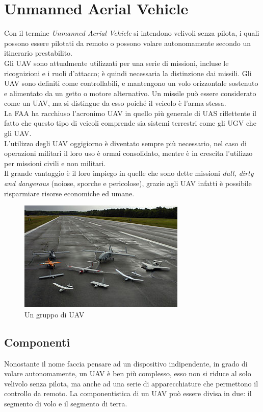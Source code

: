 \chapter{Unmanned Aerial Vehicle}
\label{cap:uav}
Con il termine \emph{Unmanned Aerial Vehicle} si intendono velivoli senza pilota, i quali possono essere pilotati da remoto
o possono volare autonomamente secondo un itinerario prestabilito. \\
Gli \ac{UAV} sono attualmente utilizzati per una serie di missioni, incluse le ricognizioni e i ruoli d'attacco; è quindi 
necessaria la distinzione dai missili. Gli \ac{UAV} sono definiti come controllabili, e mantengono un volo orizzontale 
sostenuto e alimentato da un getto o motore alternativo. Un missile può essere considerato come un \ac{UAV}, 
ma si distingue da esso poiché il veicolo è l'arma stessa. \\
La FAA ha racchiuso l'acronimo \ac{UAV} in quello più generale di \ac{UAS} riflettente il 
fatto che questo tipo di veicoli comprende sia sistemi terrestri come gli \ac{UGV} che gli \ac{UAV}. \\
L'utilizzo degli \ac{UAV} oggigiorno è diventato sempre più necessario, nel caso di operazioni militari il loro uso è ormai 
consolidato, mentre è in crescita l'utilizzo per missioni civili e non militari. \\
Il grande vantaggio è il loro impiego in quelle che sono dette missioni \emph{dull, dirty and dangerous} (noiose, sporche e 
pericolose), grazie agli \ac{UAV} infatti è possibile risparmiare risorse economiche ed umane.

\begin{figure}
  \centering
  \includegraphics[height=0.25\textheight]{Immagini/gruppouav}
  \caption{Un gruppo di \ac{UAV}}
  \label{img:gruppouav}
\end{figure}

\section{Componenti}
Nonostante il nome faccia pensare ad un dispositivo indipendente, in grado di volare autonomamente, un \ac{UAV} è ben più complesso, 
esso non si riduce al solo velivolo senza pilota, ma anche ad una serie di apparecchiature che permettono il controllo da remoto.
La componentistica di un \ac{UAV} può essere divisa in due: il segmento di volo e il segmento di terra.

